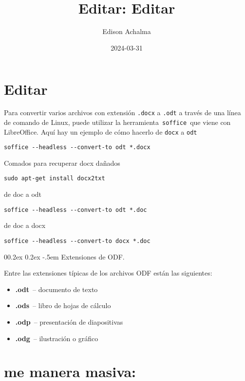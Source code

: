 \documentclass[
  jou,
  floatsintext,
  longtable,
  a4paper,
  nolmodern,
  notxfonts,
  notimes,
  colorlinks=true,linkcolor=blue,citecolor=blue,urlcolor=blue]{apa7}
\title{Editar: Editar}
\author{Edison Achalma}
\affiliation{
{Escuela Profesional de Economía, Universidad Nacional de San Cristóbal
de Huamanga}}
\date{2024-03-31}
\makeatletter
\renewcommand{\paragraph}{\@startsection{paragraph}{4}{\parindent}%
	{0\baselineskip \@plus 0.2ex \@minus 0.2ex}%
	{-.5em}%
	{\normalfont\normalsize\bfseries\typesectitle}}
\providecommand{\tightlist}{%
  \setlength{\itemsep}{0pt}\setlength{\parskip}{0pt}}
\makeatother
\begin{document}
\maketitle

\hypertarget{toc}{}
\tableofcontents
\newpage
\section[Introduction]{Editar}

\setcounter{secnumdepth}{-\maxdimen} %

\setlength\LTleft{0pt}


Para convertir varios archivos con extensión \texttt{.docx} a
\texttt{.odt} a través de una línea de comando de Linux, puede utilizar
la herramienta~\texttt{soffice}~que viene con LibreOffice. Aquí hay un
ejemplo de cómo hacerlo de \texttt{docx} a \texttt{odt}

\texttt{soffice\ -\/-headless\ -\/-convert-to\ odt\ *.docx}

Comados para recuperar docx dañados

\texttt{sudo\ apt-get\ install\ docx2txt}

de doc a odt

\texttt{soffice\ -\/-headless\ -\/-convert-to\ odt\ *.doc}

de doc a docx

\texttt{soffice\ -\/-headless\ -\/-convert-to\ docx\ *.doc}

\paragraph{Extensiones de ODF.}\label{extensiones-de-odf}

Entre las extensiones típicas de los archivos ODF están las siguientes:

\begin{itemize}
\tightlist
\item
  \textbf{.odt}~-- documento de texto
\item
  \textbf{.ods}~-- libro de hojas de cálculo
\item
  \textbf{.odp}~-- presentación de diapositivas
\item
  \textbf{.odg}~-- ilustración o gráfico
\end{itemize}

\section{me manera masiva:}\label{me-manera-masiva}
\end{document}
